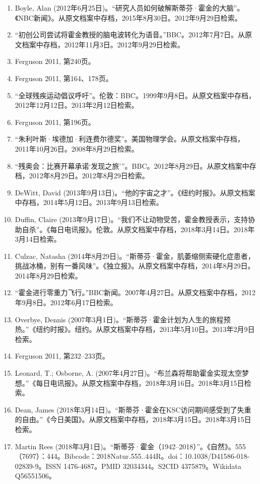 \begin{enumerate}
\item Boyle, Alan (2012年6月25日)。“研究人员如何破解斯蒂芬·霍金的大脑”。《NBC新闻》。从原文档案中存档，2015年8月30日。2012年9月29日检索。  
\item “初创公司尝试将霍金教授的脑电波转化为语音。”BBC。2012年7月7日。从原文档案中存档，2012年11月3日。2012年9月29日检索。  
\item Ferguson 2011, 第240页。  
\item Ferguson 2011, 第164、178页。  
\item “全球残疾运动倡议呼吁”。伦敦：BBC。1999年9月8日。从原文档案中存档，2012年12月12日。2013年2月12日检索。  
\item Ferguson 2011, 第196页。  
\item “朱利叶斯·埃德加·利连费尔德奖”。美国物理学会。从原文档案中存档，2011年10月26日。2008年8月29日检索。  
\item “残奥会：比赛开幕承诺‘发现之旅’”。BBC。2012年8月29日。从原文档案中存档，2012年8月29日。2012年8月29日检索。  
\item DeWitt, David (2013年9月13日)。“他的宇宙之才”。《纽约时报》。从原文档案中存档，2014年5月12日。2013年9月13日检索。  
\item Duffin, Claire (2013年9月17日)。“我们不让动物受苦，霍金教授表示，支持协助自杀”。《每日电讯报》。伦敦。从原文档案中存档，2018年3月14日。2018年3月14日检索。  
\item Culzac, Natasha (2014年8月29日)。“斯蒂芬·霍金，肌萎缩侧索硬化症患者，挑战冰桶，别有一番风味”。《独立报》。从原文档案中存档，2014年8月29日。2014年8月29日检索。  
\item “霍金进行零重力飞行。”BBC新闻。2007年4月27日。从原文档案中存档，2012年9月8日。2012年6月17日检索。  
\item Overbye, Dennis (2007年3月1日)。“斯蒂芬·霍金计划为人生的旅程预热。”《纽约时报》。纽约。从原文档案中存档，2013年5月10日。2013年2月9日检索。  
\item Ferguson 2011, 第232–233页。  
\item Leonard, T.; Osborne, A. (2007年4月27日)。“布兰森将帮助霍金实现太空梦想。”《每日电讯报》。从原文档案中存档，2018年3月16日。2018年3月15日检索。  
\item Dean, James (2018年3月14日)。“斯蒂芬·霍金在KSC访问期间感受到了失重的自由。”《今日美国》。从原文档案中存档，2018年3月15日。2018年3月15日检索。  
\item Martin Rees (2018年3月1日)。“斯蒂芬·霍金（1942–2018）”。《自然》。555（7697）：444。Bibcode：2018Natur.555..444R。doi：10.1038/D41586-018-02839-9。ISSN 1476-4687。PMID 32034344。S2CID 4375879。Wikidata Q56551506。  

\end{enumerate}
